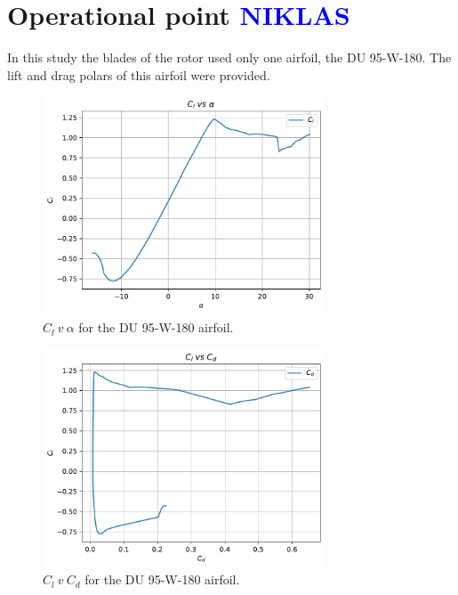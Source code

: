 \section{Operational point \textcolor{blue}{NIKLAS}}
In this study the blades of the rotor used only one airfoil, the DU 95-W-180. The lift and drag polars of this airfoil were provided. 

\begin{figure}[htbp]
\includegraphics[width=0.75\textwidth]{./img/yaw/Cl_v_alpha.pdf}
\caption{$C_l\ v\ \alpha$ for the DU 95-W-180 airfoil.}
\centering
\label{img:clva}
\end{figure}
\begin{figure}[htbp]
\includegraphics[width=0.75\textwidth]{./img/yaw/Cd_v_Cl.pdf}
\caption{$C_l\ v\ C_d$ for the DU 95-W-180 airfoil.}
\centering
\label{img:clvcd}
\end{figure}



